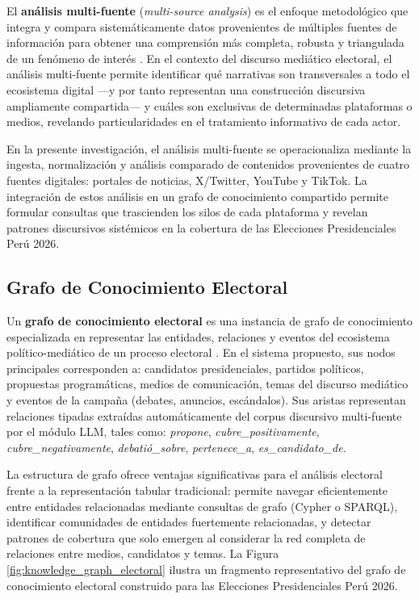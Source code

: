 El \textbf{análisis multi-fuente} (\textit{multi-source analysis}) es el enfoque metodológico que integra y compara sistemáticamente datos provenientes de múltiples fuentes de información para obtener una comprensión más completa, robusta y triangulada de un fenómeno de interés \parencite{bk_yin2018case}. En el contexto del discurso mediático electoral, el análisis multi-fuente permite identificar qué narrativas son transversales a todo el ecosistema digital —y por tanto representan una construcción discursiva ampliamente compartida— y cuáles son exclusivas de determinadas plataformas o medios, revelando particularidades en el tratamiento informativo de cada actor.

En la presente investigación, el análisis multi-fuente se operacionaliza mediante la ingesta, normalización y análisis comparado de contenidos provenientes de cuatro fuentes digitales: portales de noticias, X/Twitter, YouTube y TikTok. La integración de estos análisis en un grafo de conocimiento compartido permite formular consultas que trascienden los silos de cada plataforma y revelan patrones discursivos sistémicos en la cobertura de las Elecciones Presidenciales Perú 2026.

\subsection{Grafo de Conocimiento Electoral}

Un \textbf{grafo de conocimiento electoral} es una instancia de grafo de conocimiento especializada en representar las entidades, relaciones y eventos del ecosistema político-mediático de un proceso electoral \parencite{bk_hogan2021knowledge}. En el sistema propuesto, sus nodos principales corresponden a: candidatos presidenciales, partidos políticos, propuestas programáticas, medios de comunicación, temas del discurso mediático y eventos de la campaña (debates, anuncios, escándalos). Sus aristas representan relaciones tipadas extraídas automáticamente del corpus discursivo multi-fuente por el módulo LLM, tales como: \textit{propone}, \textit{cubre\_positivamente}, \textit{cubre\_negativamente}, \textit{debatió\_sobre}, \textit{pertenece\_a}, \textit{es\_candidato\_de}.

La estructura de grafo ofrece ventajas significativas para el análisis electoral frente a la representación tabular tradicional: permite navegar eficientemente entre entidades relacionadas mediante consultas de grafo (Cypher o SPARQL), identificar comunidades de entidades fuertemente relacionadas, y detectar patrones de cobertura que solo emergen al considerar la red completa de relaciones entre medios, candidatos y temas. La Figura \ref{fig:knowledge_graph_electoral} ilustra un fragmento representativo del grafo de conocimiento electoral construido para las Elecciones Presidenciales Perú 2026.

